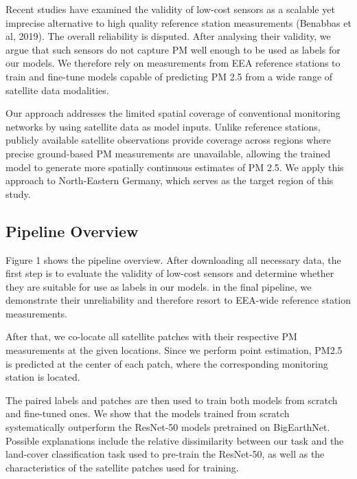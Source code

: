 \documentclass[english, a4paper, numbers=noenddot]{article}
\begin{document}

Recent studies have examined the validity of low-cost sensors as a scalable yet imprecise alternative to high quality reference station measurements (Benabbas et al, 2019). The overall reliability is disputed. After analysing their validity, we argue that such sensors do not capture PM well enough to be used as labels for our models. We therefore rely on measurements from EEA reference stations to train and fine-tune models capable of predicting PM 2.5 from a wide range of satellite data modalities.



Our approach addresses the limited spatial coverage of conventional monitoring networks by using satellite data as model inputs. Unlike reference stations, publicly available satellite observations provide coverage across regions where precise ground-based PM measurements are unavailable, allowing the trained model to generate more spatially continuous estimates of PM 2.5. We apply this approach to North-Eastern Germany, which serves as the target region of this study.


\subsection{Pipeline Overview}

Figure 1 shows the pipeline overview. After downloading all necessary data, the first step is to evaluate the validity of low-cost sensors and determine whether they are suitable for use as labels in our models. in the final pipeline, we demonstrate their unreliability and therefore resort to EEA-wide reference station measurements.

After that, we co-locate all satellite patches with their respective PM measurements at the given locations. Since we perform point estimation, PM2.5 is predicted at the center of each patch, where the corresponding monitoring station is located.


The paired labels and patches are then used to train both models from scratch and fine-tuned ones. We show that the models trained from scratch systematically outperform the ResNet-50 models pretrained on BigEarthNet. Possible explanations include the relative dissimilarity between our task and the land-cover classification task used to pre-train the ResNet-50, as well as the characteristics of the satellite patches used for training.
\end{document}
